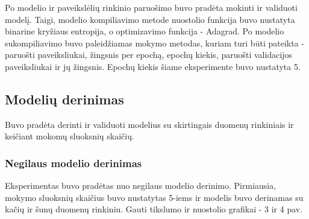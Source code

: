 \documentclass{VUMIFPSbakalaurinis}
\begin{document}
Po modelio ir paveikslėlių rinkinio paruošimo buvo pradėta mokinti ir validuoti modelį. Taigi, modelio kompiliavimo metode nuostolio 
funkcija buvo nustatyta binarine kryžiaus entropija, o optimizavimo funkcija - Adagrad. Po modelio sukompiliavimo buvo paleidžiamas mokymo metodas, kuriam turi būti pateikta - paruošti paveiksliukai, žingsnis per epochą, epochų kiekis, 
paruošti validacijos paveiksliukai ir jų žingsnis. Epochų kiekis šiame eksperimente buvo nustatyta 5.

\subsection{Modelių derinimas}
Buvo pradėta derinti ir validuoti modelius su skirtingais duomenų rinkiniais ir keičiant mokomų sluoksnių skaičių.

\subsubsection{Negilaus modelio derinimas}
Eksperimentas buvo pradėtas nuo negilaus modelio derinimo.
Pirmiausia, mokymo sluoksnių skaičius buvo nustatytas 5-iems ir modelis buvo derinamas su kačių ir šunų duomenų rinkiniu. Gauti tikslumo ir nuostolio grafikai - 3 ir 4 pav.
\end{document}
